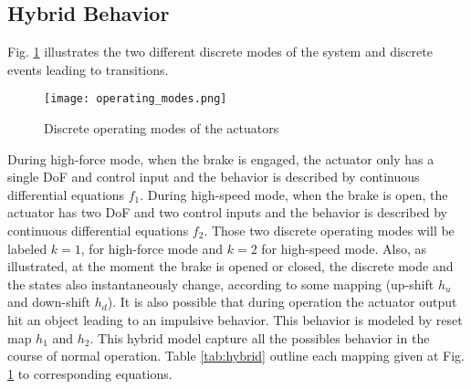 \subsection{Hybrid Behavior}

Fig. \ref{fig:operatingmodes} illustrates the two different discrete modes of the system and discrete events leading to transitions. 
%
\begin{figure}[H]
	\centering
		\texttt{[image: operating\_modes.png]}
	\caption{Discrete operating modes of the actuators}
	\label{fig:operatingmodes}
\end{figure}
%
During high-force mode, when the brake is engaged, the actuator only has a single DoF and control input and the behavior is described by continuous differential equations $f_1$. During high-speed mode, when the brake is open, the actuator has two DoF and two control inputs and the behavior is described by continuous differential equations $f_2$. Those two discrete operating modes will be labeled $k=1$, for high-force mode and $k=2$ for high-speed mode. Also, as illustrated, at the moment the brake is opened or closed, the discrete mode and the states also instantaneously change, according to some mapping (up-shift $h_u$ and down-shift $h_d$). It is also possible that during operation the actuator output hit an object leading to an impulsive behavior. This behavior is modeled by reset map $h_1$ and $h_2$. This hybrid model capture all the possibles behavior in the course of normal operation. Table \ref{tab:hybrid} outline each mapping given at Fig. \ref{fig:operatingmodes} to corresponding equations.

